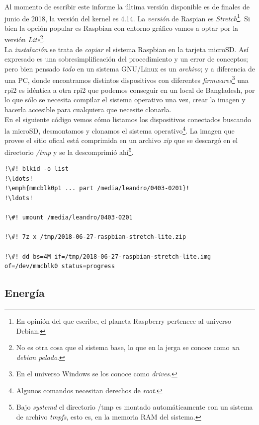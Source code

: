 \documentclass[10pt,a4paper]{article}
\begin{document}
Al momento de escribir este informe la \'ultima versi\'on disponible es de finales de junio de 2018, la versi\'on del kernel es 4.14. La \emph{versi\'on} de Raspian es \emph{Stretch}\footnote{En opini\'on del que escribe, el planeta Raspberry pertenece al universo Debian.}. Si bien la opci\'on popular es Raspbian con entorno gr\'afico vamos a optar por la versi\'on \emph{Lite}\footnote{No es otra cosa que el sistema base, lo que en la jerga se conoce como \emph{un debian pelado}.}.\\

La \emph{instalaci\'on} se trata de \emph{copiar} el sistema Raspbian en la tarjeta microSD. As\'i expresado es una sobresimplificaci\'on del procedimiento y un error de conceptos; pero bien pensado \emph{todo} en un sistema GNU/Linux es un \emph{archivo}; y a diferencia de una PC, donde encontramos distintos dispositivos con diferentes \emph{firmwares}\footnote{En el universo Windows se los conoce como \emph{drives}.} una rpi2 es id\'entica a otra rpi2 que podemos conseguir en un local de Bangladesh, por lo que s\'olo se necesita compilar el sistema operativo una vez, crear la imagen y hacerla accesible para cualquiera que necesite clonarla.\\

En el siguiente c\'odigo vemos c\'omo listamos los dispositivos conectados buscando la microSD, desmontamos y clonamos el sistema operativo\footnote{Algunos comandos necesitan derechos de \emph{root}.}. La imagen que provee el sitio ofical est\'a comprimida en un archivo \emph{zip} que se descarg\'o en el directorio \emph{/tmp} y se la descomprimi\'o ah\'i\footnote{Bajo \emph{systemd} el directorio /tmp es montado autom\'aticamente con un sistema de archivo \emph{tmpfs}, esto es, en la memoria RAM del sistema.}.\\

\begin{lstlisting}
!\#! blkid -o list
!\ldots!
!\emph{mmcblk0p1 ... part /media/leandro/0403-0201}!
!\ldots!

!\#! umount /media/leandro/0403-0201

!\#! 7z x /tmp/2018-06-27-raspbian-stretch-lite.zip

!\#! dd bs=4M if=/tmp/2018-06-27-raspbian-stretch-lite.img of=/dev/mmcblk0 status=progress
\end{lstlisting}

\subsection{Energ\'ia}
\end{document}
